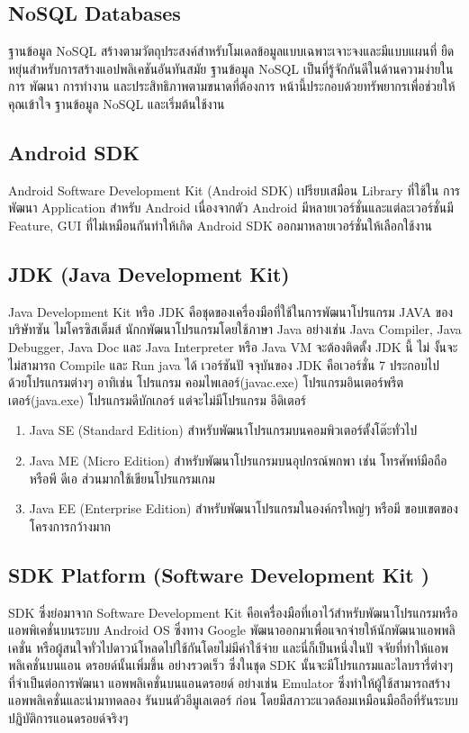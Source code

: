 \subsection{NoSQL Databases}
\quad \quad ฐานข้อมูล NoSQL \cite{nosql_is}  สร้างตามวัตถุประสงค์สําหรับโมเดลข้อมูลแบบเฉพาะเจาะจงและมีแบบแผนที่
ยืดหยุ่นสําหรับการสร้างแอปพลิเคชันอันทันสมัย ฐานข้อมูล NoSQL เป็นที่รู้จักกันดีในด้านความง่ายในการ
พัฒนา การทํางาน และประสิทธิภาพตามขนาดที่ต้องการ หน้านี้ประกอบด้วยทรัพยากรเพื่อช่วยให้คุณเข้าใจ
ฐานข้อมูล NoSQL และเริ่มต้นใช้งาน
\subsection{Android SDK}
\quad \quad Android Software Development Kit (Android SDK)\cite{sdk_tool}  เปรียบเสมือน Library ที่ใช้ใน
การพัฒนา Application สําหรับ Android เนื่องจากตัว Android มีหลายเวอร์ชั่นและแต่ละเวอร์ชั่นมี
Feature, GUI ที่ไม่เหมือนกันทําให้เกิด Android SDK ออกมาหลายเวอร์ชั่นให้เลือกใช้งาน

\subsection{JDK (Java Development Kit)}
\quad \quad Java Development Kit หรือ JDK \cite{android_studio} คือชุดของเครื่องมือที่ใช้ในการพัฒนาโปรแกรม JAVA ของ
บริษัทซัน ไมโครซิสเต็มส์ นักกพัฒนาโปรแกรมโดยใช้ภาษา Java อย่างเช่น Java Compiler, Java Debugger, Java Doc และ Java Interpreter หรือ Java VM จะต้องติดตั้ง JDK นี้ ไม่ งั้นจะไม่สามารถ
Compile และ Run java ได้ เวอร์ชันปั จจุบันของ JDK คือเวอร์ชั่น 7 ประกอบไป ด้วยโปรแกรมต่างๆ
อาทิเช่น โปรแกรม คอมไพเลอร์(javac.exe) โปรแกรมอินเตอร์พรีตเตอร์(java.exe) โปรแกรมดีบักเกอร์
แต่จะไม่มีโปรแกรม อีดิเตอร์
\begin{enumerate}
  \item  Java SE (Standard Edition) สําหรับพัฒนาโปรแกรมบนคอมพิวเตอร์ตั้งโต๊ะทั่วไป
  
  \item  Java ME (Micro Edition) สําหรับพัฒนาโปรแกรมบนอุปกรณ์พกพา เช่น โทรศัพท์มือถือหรือพี
  ดีเอ ส่วนมากใช้เขียนโปรแกรมเกม
  
  \item Java EE (Enterprise Edition) สําหรับพัฒนาโปรแกรมในองค์กรใหญ่ๆ หรือมี ขอบเขตของโครงการกว้างมาก
\end{enumerate}
\subsection{SDK Platform (Software Development Kit )}
\quad \quad SDK  ซึ่งย่อมาจาก Software Development Kit \cite{sdk_tool} คือเครื่องมือที่เอาไว้สําหรับพัฒนาโปรแกรมหรือ
แอพพิเคชั่นบนระบบ Android OS ซึ่งทาง Google พัฒนาออกมาเพื่อแจกจ่ายให้นักพัฒนาแอพพลิเคชั่น
หรือผู้สนใจทั่วไปดาวน์โหลดไปใช้กันโดยไม่มีค่าใช้จ่าย และนี่ก็เป็นหนึ่งในปั จจัยที่ทําให้แอพพลิเคชั่นบนแอน
ดรอยด์นั้นเพิ่มขึ้น อย่างรวดเร็ว ซึ่งในชุด SDK นั้นจะมีโปรแกรมและไลบรารี่ต่างๆ ที่จําเป็นต่อการพัฒนา
แอพพลิเคชั่นบนแอนดรอยด์ อย่างเช่น Emulator ซึ่งทําให้ผู้ใช้สามารถสร้างแอพพลิเคชั่นและนํามาทดลอง
รันบนตัวอีมูเลเตอร์ ก่อน โดยมีสภาวะแวดล้อมเหมือนมือถือที่รันระบบปฏิบัติการแอนดรอยด์จริงๆ
